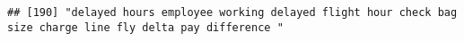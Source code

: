 \documentclass[
]{article}
\begin{document}
\begin{verbatim}
## [190] "delayed hours employee working delayed flight hour check bag size charge line fly delta pay difference "                                                                                                                                                                                                                                                                                                                                                                                                                                                                                                                                                                                                                                                                                                                                                                                                                                                                                                                                                                                                                                                                                                                                                                                                                                                                                                                                                                                                                                                                                                                                                                                                                                                                                       

\end{verbatim}
\end{document}
